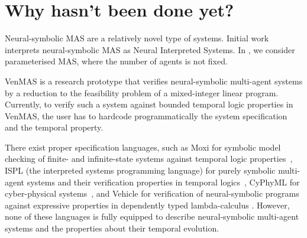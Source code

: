 \documentclass[11pt]{article}
\begin{document}





\section{Why hasn't been done yet?}



Neural-symbolic MAS are a relatively novel type of systems. Initial
work \cite{Akintunde+18,Akintunde+20,Akintunde+22} interprets
neural-symbolic MAS as Neural Interpreted Systems. In
\cite{KouvarosBB24}, we consider parameterised MAS, where the number
of agents is not fixed.

VenMAS \cite{Akintunde+22b} is a research prototype that verifies
neural-symbolic multi-agent systems by a reduction to the feasibility
problem of a mixed-integer linear program.  Currently, to verify such
a system against bounded temporal logic properties in VenMAS, the user
has to hardcode programmatically the system specification and the
temporal property.

There exist proper specification languages, such as Moxi for symbolic model
checking of finite- and infinite-state systems against temporal logic
properties~\cite{Rozier+2024}, ISPL (the interpreted systems
programming language) for purely symbolic multi-agent systems and
their verification properties in temporal logics~\cite{LomuscioQR17},
CyPhyML for cyber-physical systems~\cite{Simko+13}, and Vehicle for
verification of neural-symbolic programs against expressive properties
in dependently typed lambda-calculus \cite{Daggitt+24}. However, none
of these languages is fully equipped to describe neural-symbolic
multi-agent systems and the properties about their temporal evolution.
\end{document}
